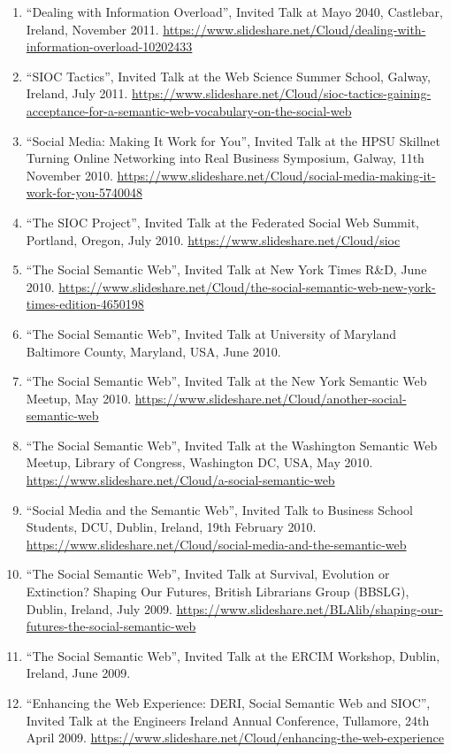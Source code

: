 \documentclass[10pt,a4paper]{res} %
\begin{document}
\begin{resume}
\begin{enumerate}
\item ``Dealing with Information Overload'', Invited Talk at Mayo 2040, Castlebar, Ireland, November 2011. \url{https://www.slideshare.net/Cloud/dealing-with-information-overload-10202433}
\item ``SIOC Tactics'', Invited Talk at the Web Science Summer School, Galway, Ireland, July 2011. \url{https://www.slideshare.net/Cloud/sioc-tactics-gaining-acceptance-for-a-semantic-web-vocabulary-on-the-social-web}
\item ``Social Media: Making It Work for You'', Invited Talk at the HPSU Skillnet Turning Online Networking into Real Business Symposium, Galway, 11th November 2010. \url{https://www.slideshare.net/Cloud/social-media-making-it-work-for-you-5740048}
\item ``The SIOC Project'', Invited Talk at the Federated Social Web Summit, Portland, Oregon, July 2010. \url{https://www.slideshare.net/Cloud/sioc}
\item ``The Social Semantic Web'', Invited Talk at New York Times R\&D, June 2010. \url{https://www.slideshare.net/Cloud/the-social-semantic-web-new-york-times-edition-4650198}
\item ``The Social Semantic Web'', Invited Talk at University of Maryland Baltimore County, Maryland, USA, June 2010. %
\item ``The Social Semantic Web'', Invited Talk at the New York Semantic Web Meetup, May 2010. \url{https://www.slideshare.net/Cloud/another-social-semantic-web}
\item ``The Social Semantic Web'', Invited Talk at the Washington Semantic Web Meetup, Library of Congress, Washington DC, USA, May 2010. \url{https://www.slideshare.net/Cloud/a-social-semantic-web}
\item ``Social Media and the Semantic Web'', Invited Talk to Business School Students, DCU, Dublin, Ireland, 19th February 2010. \url{https://www.slideshare.net/Cloud/social-media-and-the-semantic-web}
\item ``The Social Semantic Web'', Invited Talk at Survival, Evolution or Extinction? Shaping Our Futures, British Librarians Group (BBSLG), Dublin, Ireland, July 2009. \url{https://www.slideshare.net/BLAlib/shaping-our-futures-the-social-semantic-web}
\item ``The Social Semantic Web'', Invited Talk at the ERCIM Workshop, Dublin, Ireland, June 2009. %
\item ``Enhancing the Web Experience: DERI, Social Semantic Web and SIOC'', Invited Talk at the Engineers Ireland Annual Conference, Tullamore, 24th April 2009. \url{https://www.slideshare.net/Cloud/enhancing-the-web-experience}

\end{enumerate}
\end{resume}
\end{document}
